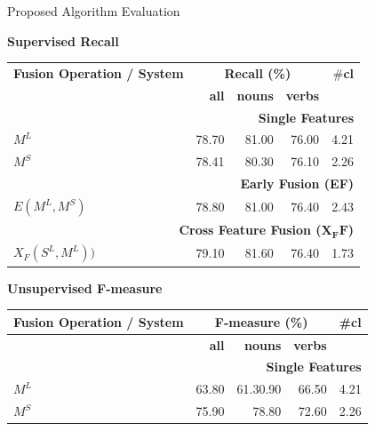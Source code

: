 \documentclass[10pt,=table]{beamer}
\newcommand\mlex{M^{\scriptscriptstyle L}}
\newcommand\msyn{M^{\scriptscriptstyle S}}
\newcommand\slex{S^{\scriptscriptstyle L}}
\begin{document}
\begin{frame}{Proposed Algorithm Evaluation}
	\vspace{.3cm}
	\begin{overprint}
			\centering \large \textbf{Supervised Recall}
			\normalsize
			
			\begin{minipage}[c][.8\textheight][c]{\linewidth}
				\centering
				\begin{tabular}{@{}lrrrr@{}}
				\toprule
				\textbf{Fusion Operation / System} & \multicolumn{3}{c}{\textbf{Recall (\%)}} & \#\textbf{cl}\\ 
				  & \textbf{all}          & \textbf{nouns}          & \textbf{verbs} &          \\ 
				  \midrule
				  \multicolumn{5}{r}{\textbf{Single Features}} \\ %
		          \rowcolor{orangeEric!70} 
				  $\mlex$ &	78.70 & 81.00 & 76.00 & 4.21\\
				  $\msyn$ & 78.41 & 80.30 & 76.10 & 2.26\\
				  \midrule
				  \multicolumn{5}{r}{\textbf{Early Fusion (EF)}} \\ 
				         $E(\mlex, \msyn)$		& 78.80 & 81.00 & 76.40 & 2.43\\
				  \midrule
				  \midrule
			   	  \multicolumn{5}{r}{\textbf{Cross Feature Fusion ($\mathbf{X_FF}$)}}       \\ %
		  		  \rowcolor{greenEric!70} 	   
				  $X_F(\slex, \mlex))$		& 79.10 & 81.60 & 76.40 & 1.73\\
				  \bottomrule
				\end{tabular}
			\end{minipage}
		\centering \large \textbf{Unsupervised F-measure}
		\normalsize
		\begin{minipage}[c][.8\textheight][c]{\linewidth}
			\centering
			\begin{tabular}{@{}lrrrr@{}}
			\toprule
			\textbf{Fusion Operation / System} & \multicolumn{3}{c}{\textbf{F-measure (\%)}} & \#\textbf{cl}\\ \midrule
		    & \textbf{all}          & \textbf{nouns}          & \textbf{verbs}           \\ 
		    \midrule
		    \multicolumn{5}{r}{\textbf{Single Features}} \\ %
		       $\mlex$                    &	63.80	 & 61.30.90 & 66.50 & 4.21\\
		 	$\msyn$                    &	75.90	& 78.80 & 72.60 & 2.26\\

\end{tabular}
\end{minipage}
\end{overprint}
\end{frame}
\end{document}
